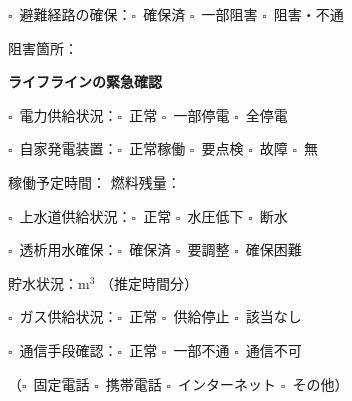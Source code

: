 \documentclass[a4paper,12pt]{jarticle}
\newcommand{\checkbox}{$\square$\ }
\newcommand{\underlinespace}[1]{\underline{\hspace{#1}}}
\begin{document}
\noindent
\checkbox 避難経路の確保：\checkbox 確保済 \quad \checkbox 一部阻害 \quad \checkbox 阻害・不通

\vspace{2mm}

\noindent
阻害箇所：\underlinespace{10cm}

\vspace{8mm}

\begin{center}
\textbf{\large ライフラインの緊急確認}
\end{center}

\vspace{3mm}

\noindent
\checkbox 電力供給状況：\checkbox 正常 \quad \checkbox 一部停電 \quad \checkbox 全停電

\vspace{2mm}

\noindent
\checkbox 自家発電装置：\checkbox 正常稼働 \quad \checkbox 要点検 \quad \checkbox 故障 \quad \checkbox 無

\vspace{2mm}

\noindent
稼働予定時間：\underlinespace{3cm} \quad 燃料残量：\underlinespace{3cm}

\vspace{3mm}

\noindent
\checkbox 上水道供給状況：\checkbox 正常 \quad \checkbox 水圧低下 \quad \checkbox 断水

\vspace{2mm}

\noindent
\checkbox 透析用水確保：\checkbox 確保済 \quad \checkbox 要調整 \quad \checkbox 確保困難

\vspace{2mm}

\noindent
貯水状況：\underlinespace{3cm}m$^3$ （推定\underlinespace{2cm}時間分）

\vspace{3mm}

\noindent
\checkbox ガス供給状況：\checkbox 正常 \quad \checkbox 供給停止 \quad \checkbox 該当なし

\vspace{3mm}

\noindent
\checkbox 通信手段確認：\checkbox 正常 \quad \checkbox 一部不通 \quad \checkbox 通信不可

\vspace{2mm}

\noindent
（\checkbox 固定電話 \quad \checkbox 携帯電話 \quad \checkbox インターネット \quad \checkbox その他）
\end{document}
